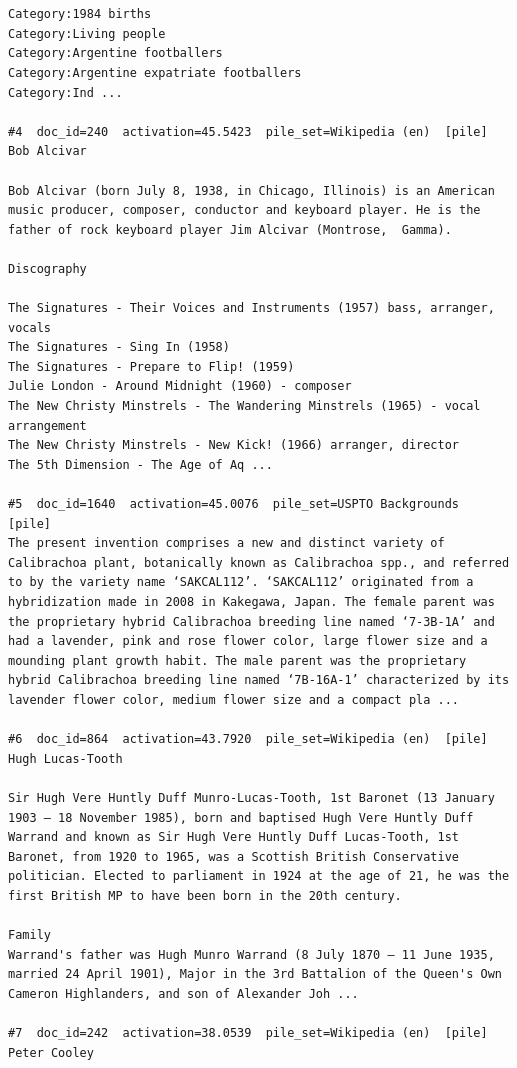\begin{verbatim}
 

Category:1984 births
Category:Living people
Category:Argentine footballers
Category:Argentine expatriate footballers
Category:Ind ...

#4  doc_id=240  activation=45.5423  pile_set=Wikipedia (en)  [pile]
Bob Alcivar

Bob Alcivar (born July 8, 1938, in Chicago, Illinois) is an American music producer, composer, conductor and keyboard player. He is the father of rock keyboard player Jim Alcivar (Montrose,  Gamma).

Discography

The Signatures - Their Voices and Instruments (1957) bass, arranger, vocals
The Signatures - Sing In (1958)
The Signatures - Prepare to Flip! (1959)
Julie London - Around Midnight (1960) - composer
The New Christy Minstrels - The Wandering Minstrels (1965) - vocal arrangement
The New Christy Minstrels - New Kick! (1966) arranger, director
The 5th Dimension - The Age of Aq ...

#5  doc_id=1640  activation=45.0076  pile_set=USPTO Backgrounds  [pile]
The present invention comprises a new and distinct variety of Calibrachoa plant, botanically known as Calibrachoa spp., and referred to by the variety name ‘SAKCAL112’. ‘SAKCAL112’ originated from a hybridization made in 2008 in Kakegawa, Japan. The female parent was the proprietary hybrid Calibrachoa breeding line named ‘7-3B-1A’ and had a lavender, pink and rose flower color, large flower size and a mounding plant growth habit. The male parent was the proprietary hybrid Calibrachoa breeding line named ‘7B-16A-1’ characterized by its lavender flower color, medium flower size and a compact pla ...

#6  doc_id=864  activation=43.7920  pile_set=Wikipedia (en)  [pile]
Hugh Lucas-Tooth

Sir Hugh Vere Huntly Duff Munro-Lucas-Tooth, 1st Baronet (13 January 1903 – 18 November 1985), born and baptised Hugh Vere Huntly Duff Warrand and known as Sir Hugh Vere Huntly Duff Lucas-Tooth, 1st Baronet, from 1920 to 1965, was a Scottish British Conservative politician. Elected to parliament in 1924 at the age of 21, he was the first British MP to have been born in the 20th century.

Family
Warrand's father was Hugh Munro Warrand (8 July 1870 – 11 June 1935, married 24 April 1901), Major in the 3rd Battalion of the Queen's Own Cameron Highlanders, and son of Alexander Joh ...

#7  doc_id=242  activation=38.0539  pile_set=Wikipedia (en)  [pile]
Peter Cooley


\end{verbatim}
